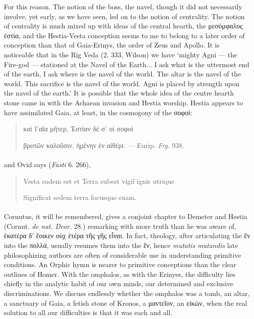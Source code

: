 \documentclass[a4paper, 11pt, oneside, polutonikogreek, english]{article}
\begin{document}
For this reason. The notion of the boss, the navel, though it did not necessarily involve, yet early, as we have seen, led on to the notion of centrality. The notion of centrality is much mixed up with ideas of the central hearth, the μεσόμφαλος ἑστία, and the Hestia-Vesta conception seems to me to belong to a later order of conception than that of Gaia-Erinys, the order of Zeus and Apollo. It is noticeable that in the Rig Veda (2. 333, Wilson) we have `mighty Agni --- the Fire-god --- stationed at the Navel of the Earth... I ask what is the uttermost end of the earth, I ask where is the navel of the world. The altar is the navel of the world. This sacrifice is the navel of the world. Agni is placed by strength upon the navel of the earth.' It is possible that the whole idea of the centre hearth stone came in with the Achaean invasion and Hestia worship. Hestia appears to have assimilated Gaia, at least, in the cosmogony of the σοφοὶ:
\begin{quotation}
καὶ Γαῖα μῆτερ, Ἐστίαν δέ σ' οἱ σοφοὶ

βροτῶν καλοῦσιν, ἡμένην ἐν αἰθέρι. --- Eurip. \emph{Frg.} 938.
\end{quotation}
\paragraph{}
and Ovid says (\emph{Fasti} 6. 266),
\begin{quotation}
Vesta eadem est et Terra subest vigil ignis utrique

Significat sedem terra focusque suam.
\end{quotation}
\paragraph{}
Cornutus, it will be remembered, gives a conjoint chapter to Demeter and Hestia (Cornut. \emph{de nat. Deor.} 28.) remarking with more truth than he was aware of, ἑκατέρα δ' ἔοικεν οὐχ ἑτέρα τῆς γῆς εἶναι. In fact, theology, after articulating the ἕν into the πολλά, usually resumes them into the ἕν, hence \emph{mutatis mutandis} late philosophizing authors are often of considerable use in understanding primitive conditions. An Orphic hymn is nearer to primitive conceptions than the clear outlines of Homer. With the omphalos, as with the Erinyes, the difficulty lies chiefly in the analytic habit of our own minds, our determined and exclusive discriminations. We discuss endlessly whether the omphalos was a tomb, an altar, a sanctuary of Gaia, a fetish stone of Kronos, a μαντεῖον, an εἰκών, when the real solution to all our difficulties is that it was each and all.
\end{document}
